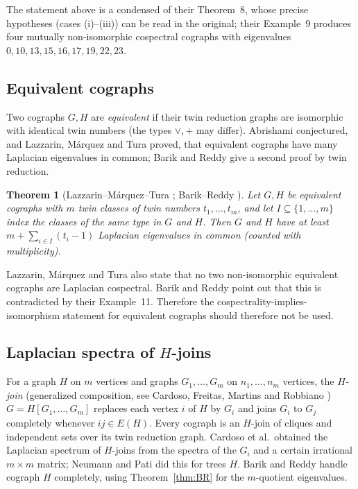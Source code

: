 \documentclass[11pt]{article}
\theoremstyle{plain}
\newtheorem{theorem}{Theorem}[section]
\theoremstyle{definition}
\theoremstyle{remark}
\begin{document}
	The statement above is a condensed of their Theorem~8, whose precise hypotheses (cases (i)--(iii)) can be read in the original; their Example~9 produces four mutually non-isomorphic cospectral cographs with eigenvalues $0,10,13,15,16,17,19,22,23$.
	
	\subsection{Equivalent cographs}
	\label{sub:equiv}
	
	Two cographs $G,H$ are \emph{equivalent} if their twin reduction graphs are isomorphic with identical twin numbers (the types $\vee,+$ may differ). Abrishami \cite{Abrishami2019} conjectured, and Lazzarin, M\'arquez and Tura \cite{LazzarinSosaTura2023} proved, that equivalent cographs have many Laplacian eigenvalues in common; Barik and Reddy give a second proof by twin reduction.
	
	\begin{theorem}[Lazzarin--M\'arquez--Tura \cite{LazzarinSosaTura2023}; Barik--Reddy \cite{BarikReddy2023}]
		\label{thm:LST}
		Let $G,H$ be equivalent cographs with $m$ twin classes of twin numbers $t_1,\dots,t_m$, and let $I\subseteq\{1,\dots,m\}$ index the classes of the same type in $G$ and $H$. Then $G$ and $H$ have at least $m+\sum_{i\in I}(t_i-1)$ Laplacian eigenvalues in common (counted with multiplicity).
	\end{theorem}
	
	Lazzarin, M\'arquez and Tura also state that no two non-isomorphic equivalent cographs are Laplacian cospectral. Barik and Reddy \cite{BarikReddy2023} point out that this is contradicted by their Example~11. Therefore the cospectrality-implies-isomorphism statement for equivalent cographs should therefore not be used.
	
	\subsection{Laplacian spectra of $H$-joins}
	\label{sub:Hjoin}
	
	For a graph $H$ on $m$ vertices and graphs $G_1,\dots,G_m$ on $n_1,\dots,n_m$ vertices, the \emph{$H$-join} (generalized composition, see Cardoso, Freitas, Martins and Robbiano \cite{CardosoEtAl2013}) $G=H[G_1,\dots,G_m]$ replaces each vertex $i$ of $H$ by $G_i$ and joins $G_i$ to $G_j$ completely whenever $ij\in E(H)$. Every cograph is an $H$-join of cliques and independent sets over its twin reduction graph. Cardoso et al.\ obtained the Laplacian spectrum of $H$-joins from the spectra of the $G_i$ and a certain irrational $m\times m$ matrix; Neumann and Pati did this for trees $H$. Barik and Reddy handle cograph $H$ completely, using Theorem~\ref{thm:BR} for the $m$-quotient eigenvalues.
	
\end{document}
